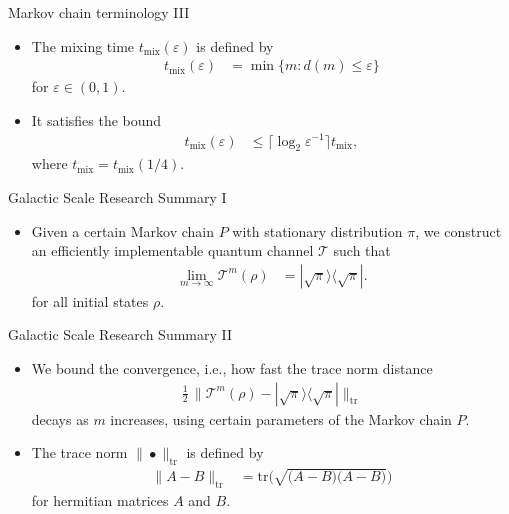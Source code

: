 \documentclass{beamer}
\renewcommand{\>}{\rangle}
\newcommand{\<}{\langle}
\newcommand{\tr}{\mathrm{tr}}
\newcommand{\cT}{\mathcal{T}}
\begin{document}

\begin{frame}{Markov chain terminology III}
\begin{itemize}
\item The mixing time $t_\mathrm{mix}(\varepsilon)$ is defined by
\begin{align*}
    t_\mathrm{mix}(\varepsilon) 
    &= 
    \min\{m : d(m) \le \varepsilon \}
\end{align*}
for $\varepsilon\in (0,1)$. 

\bigskip
\item It satisfies the bound
\begin{align*}
    t_\mathrm{mix}(\varepsilon) 
    &\le \big\lceil \log_2\varepsilon^{-1} \big\rceil t_\mathrm{mix},
\end{align*}
where $t_\mathrm{mix}=t_\mathrm{mix}(1/4)$.
\end{itemize}
\end{frame}


\begin{frame}{Galactic Scale Research Summary I}

\begin{itemize}
    \item Given a certain Markov chain $P$ with stationary distribution $\pi$, we construct an efficiently implementable quantum channel $\cT$ such that
    \begin{align*}
        \lim_{m\rightarrow\infty} \cT^m(\rho) 
        &=
        |\sqrt{\pi}\>\<\sqrt{\pi}|.
    \end{align*}
    for all initial states $\rho$.
\end{itemize}
\end{frame}


\begin{frame}{Galactic Scale Research Summary II}

\begin{itemize}
    \item We bound the convergence, i.e., how fast the trace norm distance
    \begin{align*}
        \tfrac{1}{2} \, \| \cT^m(\rho) - |\sqrt{\pi}\>\<\sqrt{\pi}| \|_\mathrm{tr}
    \end{align*}
    decays as $m$ increases, using certain parameters of the Markov chain $P$.

    \medskip
    \item The trace norm $\| \bullet \|_\mathrm{tr}$ is defined by
    \begin{align*}
        \| A - B \|_\mathrm{tr} 
        &= 
        \tr\Big( \sqrt{\big(A - B\big) \big(A-B\big)} \Big)
    \end{align*}
    for hermitian matrices $A$ and $B$.
\end{itemize}
\end{frame}
\end{document}
